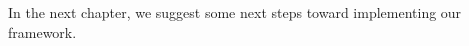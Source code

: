 In the next chapter, we suggest some next steps toward implementing 
our framework.








%
%




